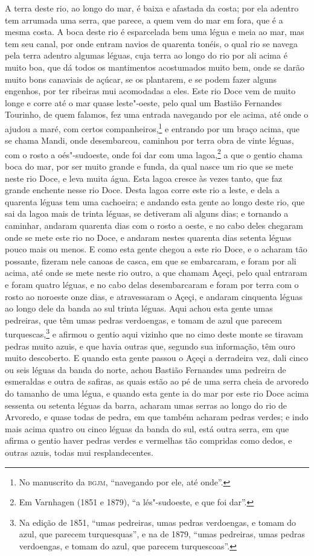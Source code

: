 \begin{linenumbers}
A terra deste rio, ao longo do mar, é baixa e afastada da costa; por ela adentro tem
arrumada uma serra, que parece, a quem vem do mar em fora, que é a mesma costa. A boca
deste rio é esparcelada bem uma légua e meia ao mar, mas tem seu canal, por onde entram
navios de quarenta tonéis, o qual rio se navega pela terra adentro algumas léguas, cuja
terra ao longo do rio por ali acima é muito boa, que dá todos os mantimentos acostumados
muito bem, onde se darão muito bons canaviais de açúcar, se os plantarem, e se podem fazer
alguns engenhos, por ter ribeiras mui acomodadas a eles. Este rio Doce vem de muito longe
e corre até o mar quase leste"-oeste, pelo qual um Bastião Fernandes Tourinho, de quem
falamos, fez uma entrada navegando por ele acima, até onde o ajudou a maré, com certos
companheiros,\footnote{ No manuscrito da \textsc{bgjm}, ``navegando por ele, até onde''.}
e entrando por um braço acima, que se chama Mandi, onde desembarcou, caminhou por terra
obra de vinte léguas, com o rosto a oés"-sudoeste, onde foi dar com uma lagoa,\footnote{ Em
Varnhagen (1851 e 1879), ``a lés"-sudoeste, e que foi dar''.} a que o gentio chama boca do
mar, por ser muito grande e funda, da qual nasce um rio que se mete neste rio Doce, e leva
muita água. Esta lagoa cresce às vezes tanto, que faz grande enchente nesse rio Doce.
Desta lagoa corre este rio a leste, e dela a quarenta léguas tem uma cachoeira; e andando
esta gente ao longo deste rio, que sai da lagoa mais de trinta léguas, se detiveram ali
alguns dias; e tornando a caminhar, andaram quarenta dias com o rosto a oeste, e no cabo
deles chegaram onde se mete este rio no Doce, e andaram nestes quarenta dias setenta
léguas pouco mais ou menos. E como esta gente chegou a este rio Doce, e o acharam tão
possante, fizeram nele canoas de casca, em que se embarcaram, e foram por ali acima, até
onde se mete neste rio outro, a que chamam Açeçi, pelo qual entraram e foram quatro
léguas, e no cabo delas desembarcaram e foram por terra com o rosto ao noroeste onze dias,
e atravessaram o Açeçi, e andaram cinquenta léguas ao longo dele da banda ao sul trinta
léguas. Aqui achou esta gente umas pedreiras, que têm umas pedras verdoengas, e tomam de
azul que parecem turquescas,\footnote{ Na edição de 1851, ``umas pedreiras, umas pedras
verdoengas, e tomam do azul, que parecem turquesquas'', e na de 1879, ``umas pedreiras,
umas pedras verdoengas, e tomam do azul, que parecem turquescoas''.} e afirmou o gentio
aqui vizinho que no cimo deste monte se tiravam pedras muito azuis, e que havia outras
que, segundo sua informação, têm ouro muito descoberto. E quando esta gente passou o Açeçi
a derradeira vez, dali cinco ou seis léguas da banda do norte, achou Bastião Fernandes uma
pedreira de esmeraldas e outra de safiras, as quais estão ao pé de uma serra cheia de
arvoredo do tamanho de uma légua, e quando esta gente ia do mar por este rio Doce acima
sessenta ou setenta léguas da barra, acharam umas serras ao longo do rio de Arvoredo, e
quase todas de pedra, em que também acharam pedras verdes; e indo mais acima quatro ou
cinco léguas da banda do sul, está outra serra, em que afirma o gentio haver pedras verdes
e vermelhas tão compridas como dedos, e outras azuis, todas mui resplandecentes.


\end{linenumbers}
